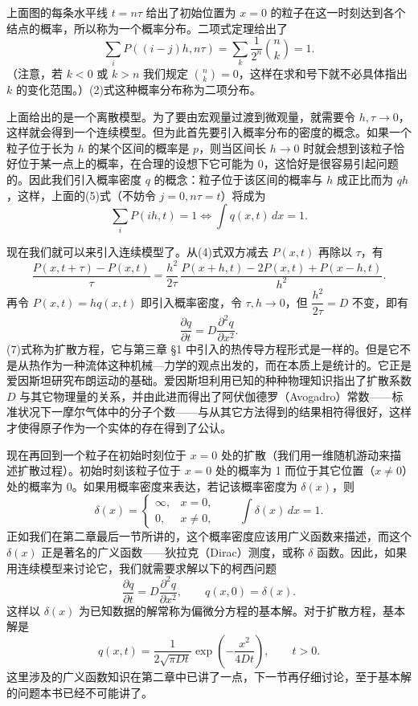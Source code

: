 上面图的每条水平线 $t=n\tau$ 给出了初始位置为 $x=0$ 的粒子在这一时刻达到各个结点的概率，所以称为一个概率分布。二项式定理给出了
\begin{equation}
 \sum_i P((i-j)h,n\tau)=\sum_k\frac1{2^n}\binom nk=1.
 \tag{5}
\end{equation}
（注意，若 $k<0$ 或 $k>n$ 我们规定 $\binom nk=0$，这样在求和号下就不必具体指出 $k$ 的变化范围。）(2)式这种概率分布称为二项分布。

上面给出的是一个离散模型。为了要由宏观量过渡到微观量，就需要令 $h,\tau\to0$，这样就会得到一个连续模型。但为此首先要引入概率分布的密度的概念。如果一个粒子位于长为 $h$ 的某个区间的概率是 $p$，则当区间长 $h\to0$ 时就会想到该粒子恰好位于某一点上的概率，在合理的设想下它可能为 $0$，这恰好是很容易引起问题的。因此我们引入概率密度 $q$ 的概念：粒子位于该区间的概率与 $h$ 成正比而为 $qh$，这样，上面的(5)式（不妨令 $j=0,n\tau=t$）将成为
\begin{equation}
 \sum_i P(ih,t)=1\Longleftrightarrow\int q(x,t)\,dx=1.
 \tag{6}
\end{equation}

现在我们就可以来引入连续模型了。从(4)式双方减去 $P(x,t)$ 再除以 $\tau$，有
\[
 \frac{P(x,t+\tau)-P(x,t)}{\tau}
 =\frac{h^2}{2\tau}\,
 \frac{P(x+h,t)-2P(x,t)+P(x-h,t)}{h^2}.
\]
再令 $P(x,t)=h q(x,t)$ 即引入概率密度，令 $\tau,h\to0$，但 $\dfrac{h^2}{2\tau}=D$ 不变，即有
\begin{equation}
 \frac{\partial q}{\partial t}=D\frac{\partial^2q}{\partial x^2}.
 \tag{7}
\end{equation}
(7)式称为扩散方程，它与第三章 §1 中引入的热传导方程形式是一样的。但是它不是从热作为一种流体这种机械—力学的观点出发的，而在本质上是统计的。它正是爱因斯坦研究布朗运动的基础。爱因斯坦利用已知的种种物理知识指出了扩散系数 $D$ 与其它物理量的关系，并由此进而得出了阿伏伽德罗（Avogadro）常数——标准状况下一摩尔气体中的分子个数——与从其它方法得到的结果相符得很好，这样才使得原子作为一个实体的存在得到了公认。

现在再回到一个粒子在初始时刻位于 $x=0$ 处的扩散（我们用一维随机游动来描述扩散过程）。初始时刻该粒子位于 $x=0$ 处的概率为 1 而位于其它位置（$x\ne0$）处的概率为 0。如果用概率密度来表达，若记该概率密度为 $\delta(x)$，则
\[
 \delta(x)=
 \begin{cases}
 \infty,&x=0,\\
 0,&x\ne0,
 \end{cases}
 \qquad
 \int\delta(x)\,dx=1.
\]
正如我们在第二章最后一节所讲的，这个概率密度应该用广义函数来描述，而这个 $\delta(x)$ 正是著名的广义函数——狄拉克（Dirac）测度，或称 $\delta$ 函数。因此，如果用连续模型来讨论它，我们就需要求解以下的柯西问题
\begin{equation}
 \frac{\partial q}{\partial t}=D\frac{\partial^2q}{\partial x^2},\qquad q(x,0)=\delta(x).
 \tag{8}
\end{equation}
这样以 $\delta(x)$ 为已知数据的解常称为偏微分方程的基本解。对于扩散方程，基本解是
\begin{equation}
 q(x,t)=\frac1{2\sqrt{\pi Dt}}\exp\!\left(-\frac{x^2}{4Dt}\right),\qquad t>0.
 \tag{9}
\end{equation}
这里涉及的广义函数知识在第二章中已讲了一点，下一节再仔细讨论，至于基本解的问题本书已经不可能讲了。

